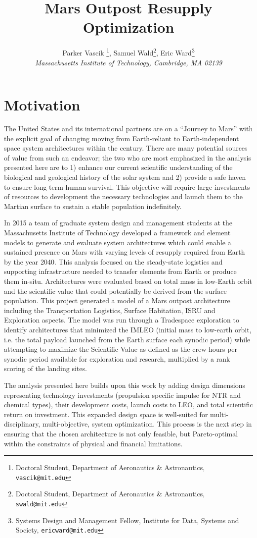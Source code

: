 \documentclass[]{aiaa-pretty}
\author[Vascik, Wald, and Ward]{ %
Parker Vascik \thanks{Doctoral Student, Department of Aeronautics \& Astronautics, \texttt{vascik@mit.edu}},
Samuel Wald\thanks{Doctoral Student, Department of Aeronautics \& Astronautics, \texttt{swald@mit.edu}},
Eric Ward\thanks{Systems Design and Management Fellow, Institute for Data, Systems and Society, \texttt{ericward@mit.edu}}\\
\textit{Massachusetts Institute of Technology, Cambridge, MA 02139}}
\title{Mars Outpost Resupply Optimization}
\begin{document}
\maketitle

\section{Motivation}
\label{sec:Motivation}
The United States and its international partners are on a “Journey to Mars” with the explicit goal of changing moving from Earth-reliant to Earth-independent space system architectures within the century. \cite{craig2015pioneering} There are many potential sources of value from such an endeavor; the two who are most emphasized in the analysis presented here are to 1) enhance our current scientific understanding of the biological and geological history of the solar system and 2) provide a safe haven to ensure long-term human survival. \cite{NRC2014} This objective will require large investments of resources to development the necessary technologies and launch them to the Martian surface to sustain a stable population indefinitely. 

In 2015 a team of graduate system design and management students at the Massachusetts Institute of Technology developed a framework and element models to generate and evaluate system architectures which could enable a sustained presence on Mars with varying levels of resupply required from Earth by the year 2040. This analysis focused on the steady-state logistics and supporting infrastructure needed to transfer elements from Earth or produce them in-situ. Architectures were evaluated based on total mass in low-Earth orbit and the scientific value that could potentially be derived from the surface population. This project generated a model of a Mars outpost architecture including the Transportation Logistics, Surface Habitation, ISRU and Exploration aspects. The model was run through a Tradespace exploration to identify architectures that minimized the IMLEO (initial mass to low-earth orbit, i.e. the total payload launched from the Earth surface each synodic period) while attempting to maximize the Scientific Value as defined as the crew-hours per synodic period available for exploration and research, multiplied by a rank scoring of the landing sites.

The analysis presented here builds upon this work by adding design dimensions representing technology investments (propulsion specific impulse for NTR and chemical types), their development costs, launch costs to LEO, and total scientific return on investment. This expanded design space is well-suited for multi-disciplinary, multi-objective, system optimization. This process is the next step in ensuring that the chosen architecture is not only feasible, but Pareto-optimal within the constraints of physical and financial limitations. 
\end{document}
